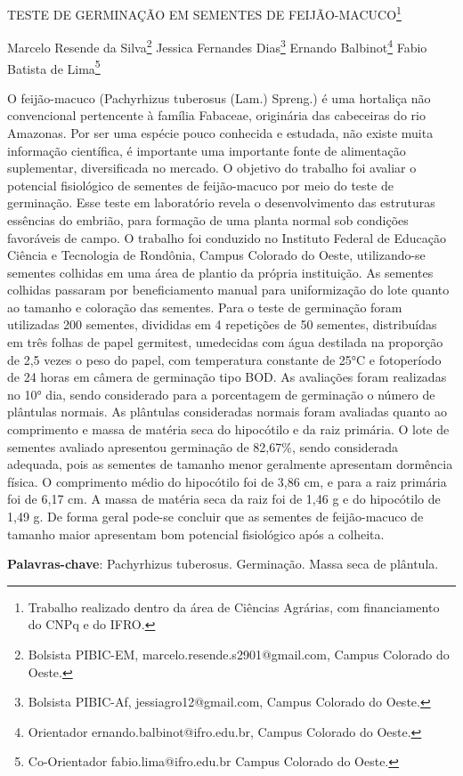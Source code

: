 \documentclass[article,12pt,onesidea,4paper,english,brazil]{abntex2}
\begin{document}
	
	
	\frenchspacing 
	
	\begin{center}
		\LARGE TESTE DE GERMINAÇÃO EM SEMENTES DE FEIJÃO-MACUCO\footnote{Trabalho realizado dentro da área de Ciências Agrárias, com financiamento do CNPq e do IFRO.}
		
		\normalsize
	Marcelo Resende da Silva\footnote{Bolsista PIBIC-EM, marcelo.resende.s2901@gmail.com, Campus Colorado do Oeste.} 
	Jessica Fernandes Dias\footnote{Bolsista PIBIC-Af, jessiagro12@gmail.com, Campus Colorado do Oeste.} 
	Ernando Balbinot\footnote{Orientador ernando.balbinot@ifro.edu.br, Campus Colorado do Oeste.} 
	Fabio Batista de Lima\footnote{Co-Orientador fabio.lima@ifro.edu.br Campus Colorado do Oeste.} 
	\end{center}
	
	\noindent O feijão-macuco (Pachyrhizus tuberosus (Lam.) Spreng.) é uma hortaliça não convencional pertencente à família Fabaceae, originária das cabeceiras do rio Amazonas. Por ser uma espécie pouco conhecida e estudada, não existe muita informação científica, é importante uma importante fonte de alimentação suplementar, diversificada no mercado. O objetivo do trabalho foi avaliar o potencial fisiológico de sementes de feijão-macuco por meio do teste de germinação. Esse teste em laboratório revela o desenvolvimento das estruturas essências do embrião, para formação de uma planta normal sob condições favoráveis de campo. O trabalho foi conduzido no Instituto Federal de Educação Ciência e Tecnologia de Rondônia, Campus Colorado do Oeste, utilizando-se sementes colhidas em uma área de plantio da própria instituição. As sementes colhidas passaram por beneficiamento manual para uniformização do lote quanto ao tamanho e coloração das sementes. Para o teste de germinação foram utilizadas 200 sementes, divididas em 4 repetições de 50 sementes, distribuídas em três folhas de papel germitest, umedecidas com água destilada na proporção de 2,5 vezes o peso do papel, com temperatura constante de 25°C e fotoperíodo de 24 horas em câmera de germinação tipo BOD. As avaliações foram realizadas no 10° dia, sendo considerado para a porcentagem de germinação o número de plântulas normais. As plântulas consideradas normais foram avaliadas quanto ao comprimento e massa de matéria seca do hipocótilo e da raiz primária. O lote de sementes avaliado apresentou germinação de 82,67\%, sendo considerada adequada, pois as sementes de tamanho menor geralmente apresentam dormência física. O comprimento médio do hipocótilo foi de 3,86 cm, e para a raiz primária foi de 6,17 cm. A massa de matéria seca da raiz foi de 1,46 g e do hipocótilo de 1,49 g. De forma geral pode-se concluir que as sementes de feijão-macuco de tamanho maior apresentam bom potencial fisiológico após a colheita.
	
	\vspace{\onelineskip}
	
	\noindent
	\textbf{Palavras-chave}: Pachyrhizus tuberosus. Germinação. Massa seca de plântula.
	
\end{document}
